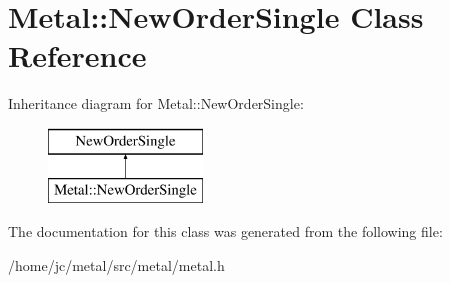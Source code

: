 \hypertarget{classMetal_1_1NewOrderSingle}{}\section{Metal\+:\+:New\+Order\+Single Class Reference}
\label{classMetal_1_1NewOrderSingle}
Inheritance diagram for Metal\+:\+:New\+Order\+Single\+:\begin{figure}[H]
\begin{center}
\leavevmode
\includegraphics[height=2.000000cm]{classMetal_1_1NewOrderSingle}
\end{center}
\end{figure}


The documentation for this class was generated from the following file\+:\begin{DoxyCompactItemize}
\item 
/home/jc/metal/src/metal/metal.\+h\end{DoxyCompactItemize}
